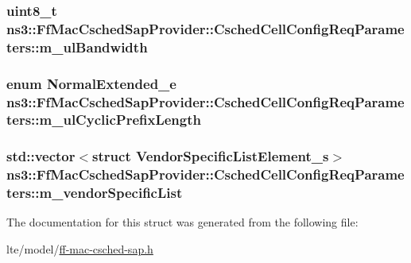 \subsubsection[{\texorpdfstring{m\+\_\+ul\+Bandwidth}{m_ulBandwidth}}]{\setlength{\rightskip}{0pt plus 5cm}uint8\+\_\+t ns3\+::\+Ff\+Mac\+Csched\+Sap\+Provider\+::\+Csched\+Cell\+Config\+Req\+Parameters\+::m\+\_\+ul\+Bandwidth}\hypertarget{structns3_1_1FfMacCschedSapProvider_1_1CschedCellConfigReqParameters_a5ab5b102878e6e7e7727a14af4a64d2f}{}\label{structns3_1_1FfMacCschedSapProvider_1_1CschedCellConfigReqParameters_a5ab5b102878e6e7e7727a14af4a64d2f}
\subsubsection[{\texorpdfstring{m\+\_\+ul\+Cyclic\+Prefix\+Length}{m_ulCyclicPrefixLength}}]{\setlength{\rightskip}{0pt plus 5cm}enum {\bf Normal\+Extended\+\_\+e} ns3\+::\+Ff\+Mac\+Csched\+Sap\+Provider\+::\+Csched\+Cell\+Config\+Req\+Parameters\+::m\+\_\+ul\+Cyclic\+Prefix\+Length}\hypertarget{structns3_1_1FfMacCschedSapProvider_1_1CschedCellConfigReqParameters_a586efa8b972393ea20ac6a8e2e5e4200}{}\label{structns3_1_1FfMacCschedSapProvider_1_1CschedCellConfigReqParameters_a586efa8b972393ea20ac6a8e2e5e4200}
\subsubsection[{\texorpdfstring{m\+\_\+vendor\+Specific\+List}{m_vendorSpecificList}}]{\setlength{\rightskip}{0pt plus 5cm}std\+::vector$<$struct {\bf Vendor\+Specific\+List\+Element\+\_\+s}$>$ ns3\+::\+Ff\+Mac\+Csched\+Sap\+Provider\+::\+Csched\+Cell\+Config\+Req\+Parameters\+::m\+\_\+vendor\+Specific\+List}\hypertarget{structns3_1_1FfMacCschedSapProvider_1_1CschedCellConfigReqParameters_a7b116db831ef64dd3779ba441c3521ae}{}\label{structns3_1_1FfMacCschedSapProvider_1_1CschedCellConfigReqParameters_a7b116db831ef64dd3779ba441c3521ae}


The documentation for this struct was generated from the following file\+:\begin{DoxyCompactItemize}
\item 
lte/model/\hyperlink{ff-mac-csched-sap_8h}{ff-\/mac-\/csched-\/sap.\+h}\end{DoxyCompactItemize}
